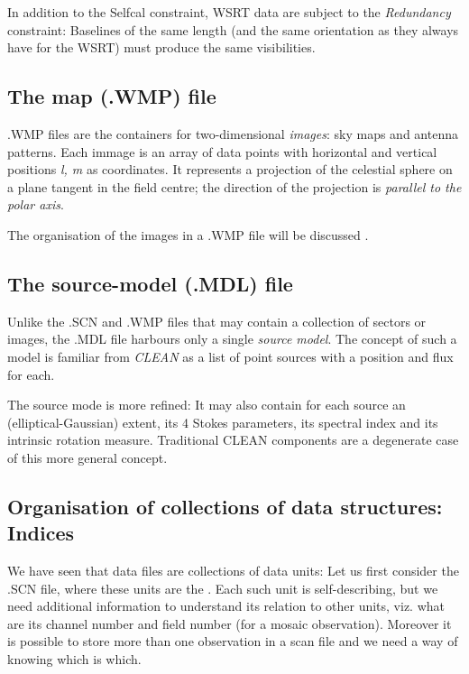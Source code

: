 	In addition to the Selfcal constraint, WSRT data are subject to the
{\em Redundancy} constraint: Baselines of the same length (and the same
orientation as they always have for the WSRT) must produce the same
visibilities.


\subsection{ The map (.WMP) file }
\label{.wmp.file}

	.WMP files are the containers for two-dimensional {\em images}: sky
maps and antenna patterns. Each immage is an array of data points with
horizontal and vertical positions {\em l, m} as coordinates. It represents a
projection of the celestial sphere on a plane tangent in the field centre; the
direction of the projection is {\em parallel to the polar axis}.

	The organisation of the images in a .WMP file will be discussed
.


\subsection{ The source-model (.MDL) file }
\label{.mdl.file}

	Unlike the .SCN and .WMP files that may contain a collection of sectors
or images, the .MDL file harbours only a single {\em source model}. The concept
of such a model is familiar from {\em CLEAN} as a list of point sources with a
position and flux for each.

	The \NEWSTAR source mode is more refined: It may also contain for each
source an (elliptical-Gaussian) extent, its 4 Stokes parameters, its spectral
index and its intrinsic rotation measure. Traditional CLEAN components are a
degenerate case of this more general concept.


\subsection{ Organisation of collections of data structures: Indices}
\label{.indices}
\label{.SCNSUM.indices}

	We have seen that \NEWSTAR data files are collections of data units:
Let us first consider the .SCN file, where these units are the
. Each such unit is self-describing, but we need
additional information to understand its relation to other units, viz. what are
its channel number and field number (for a mosaic observation). Moreover it is
possible to store more than one observation in a scan file and we need a way of
knowing which is which.

